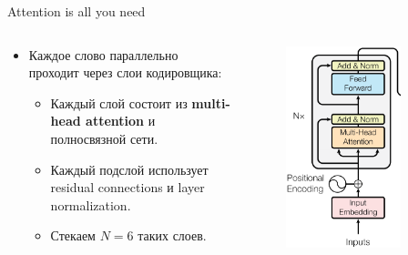 \begin{frame}[c]{Attention is all you need}
\begin{columns}[c]
	\begin{column}{0.6\textwidth}
		\begin{itemize}
			\item Каждое слово параллельно проходит через слои кодировщика:
			\begin{itemize}
				[circle]
				\item Каждый слой состоит из \textbf{multi-head attention} и полносвязной сети.
				\item Каждый подслой использует residual connections и layer normalization.
				\item Стекаем $N = 6$ таких слоев. 
			\end{itemize}
		\end{itemize}
	\end{column}
	\begin{column}{0.4\textwidth}
		\begin{figure}
			\centering
			\includegraphics[width=0.8\textwidth]{figures/tranformer_encoder.png}
		\end{figure}
	\end{column}
\end{columns}
\end{frame}

